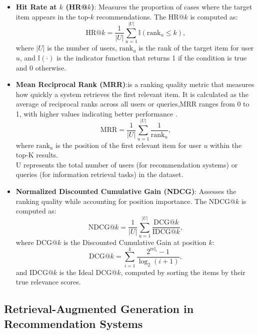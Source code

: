 \begin{itemize}
	\item \textbf{Hit Rate at \( k \) (HR@\( k \))}: Measures the proportion of cases where the target item appears in the top-\( k \) recommendations. The HR@\( k \) is computed as:\citep{Tamm_2021}
	\begin{equation}
		\text{HR@}k = \frac{1}{|U|} \sum_{u=1}^{|U|} \mathbb{I}(\text{rank}_u \leq k),
	\end{equation}
	where \( |U| \) is the number of users, \( \text{rank}_u \) is the rank of the target item for user \( u \), and \( \mathbb{I}(\cdot) \) is the indicator function that returns 1 if the condition is true and 0 otherwise.
	
	\item \textbf{Mean Reciprocal Rank (MRR)}:is a ranking quality metric that measures how quickly a system retrieves the first relevant item. It is calculated as the average of reciprocal ranks across all users or queries,MRR ranges from 0 to 1, with higher values indicating better performance \citep{Tamm_2021}.
	\begin{equation}
		\text{MRR} = \frac{1}{|U|} \sum_{u=1}^{|U|} \frac{1}{\text{rank}_u},
	\end{equation}
	where \( \text{rank}_u \) is the position of the first relevant item for user \( u \) within the top-K results. \\ 
	U represents the total number of users (for recommendation systems) or queries (for information retrieval tasks) in the dataset.
	
	\item \textbf{Normalized Discounted Cumulative Gain (NDCG)}: Assesses the ranking quality while accounting for position importance. The NDCG@\( k \) is computed as:\citep{Tamm_2021}
	\begin{equation}
		\text{NDCG@}k = \frac{1}{|U|} \sum_{u=1}^{|U|} \frac{\text{DCG@}k}{\text{IDCG@}k},
	\end{equation}
	where \( \text{DCG@}k \) is the Discounted Cumulative Gain at position \( k \):
	\begin{equation}
		\text{DCG@}k = \sum_{i=1}^{k} \frac{2^{\text{rel}_i} - 1}{\log_2(i + 1)},
	\end{equation}
	and \( \text{IDCG@}k \) is the Ideal DCG@\( k \), computed by sorting the items by their true relevance scores.
\end{itemize} 

\subsection{Retrieval-Augmented Generation in Recommendation Systems}

